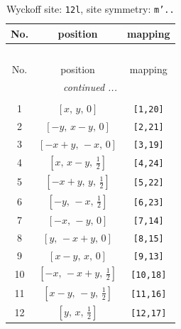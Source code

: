 \documentclass[fleqn,8pt]{jsarticle}
\begin{document}
\begin{longtable}{ccc}
\caption{Wyckoff site: {\tt 12l}, site symmetry: {\tt m'..}}
 \\
 \hline \hline
No. & position & mapping \\ \hline \endfirsthead

\multicolumn{2}{l}{\tablename\ \thetable{}} \\
 \hline \hline
No. & position & mapping \\ \hline \endhead

 \hline \hline
\multicolumn{2}{r}{\footnotesize\it continued ...} \\ \endfoot

 \hline \hline
\multicolumn{2}{r}{} \\ \endlastfoot

1 & $\left[ x,\, y,\, 0 \right]$ & {\tt [1,20]} \\ \hline
2 & $\left[ - y,\, x - y,\, 0 \right]$ & {\tt [2,21]} \\ \hline
3 & $\left[ - x + y,\, - x,\, 0 \right]$ & {\tt [3,19]} \\ \hline
4 & $\left[ x,\, x - y,\, \frac{1}{2} \right]$ & {\tt [4,24]} \\ \hline
5 & $\left[ - x + y,\, y,\, \frac{1}{2} \right]$ & {\tt [5,22]} \\ \hline
6 & $\left[ - y,\, - x,\, \frac{1}{2} \right]$ & {\tt [6,23]} \\ \hline
7 & $\left[ - x,\, - y,\, 0 \right]$ & {\tt [7,14]} \\ \hline
8 & $\left[ y,\, - x + y,\, 0 \right]$ & {\tt [8,15]} \\ \hline
9 & $\left[ x - y,\, x,\, 0 \right]$ & {\tt [9,13]} \\ \hline
10 & $\left[ - x,\, - x + y,\, \frac{1}{2} \right]$ & {\tt [10,18]} \\ \hline
11 & $\left[ x - y,\, - y,\, \frac{1}{2} \right]$ & {\tt [11,16]} \\ \hline
12 & $\left[ y,\, x,\, \frac{1}{2} \right]$ & {\tt [12,17]} \\
\end{longtable}
\renewcommand{\arraystretch}{1.2}
\end{document}
